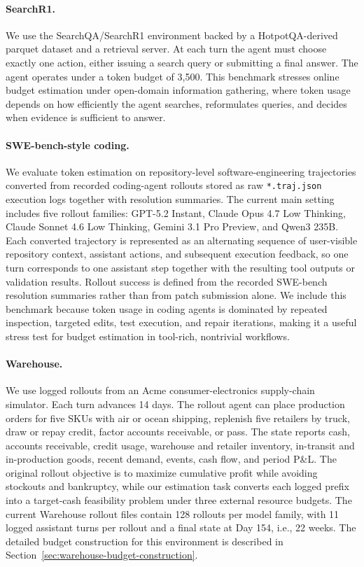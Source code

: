 \paragraph{SearchR1.}
We use the SearchQA/SearchR1 environment backed by a HotpotQA-derived parquet dataset and a retrieval server. At each turn the agent must choose exactly one action, either issuing a search query or submitting a final answer. The agent operates under a token budget of 3{,}500. This benchmark stresses online budget estimation under open-domain information gathering, where token usage depends on how efficiently the agent searches, reformulates queries, and decides when evidence is sufficient to answer.

\paragraph{SWE-bench-style coding.}
We evaluate token estimation on repository-level software-engineering trajectories converted from recorded coding-agent rollouts stored as raw \texttt{*.traj.json} execution logs together with resolution summaries. The current main setting includes five rollout families: GPT-5.2 Instant, Claude Opus 4.7 Low Thinking, Claude Sonnet 4.6 Low Thinking, Gemini 3.1 Pro Preview, and Qwen3 235B. Each converted trajectory is represented as an alternating sequence of user-visible repository context, assistant actions, and subsequent execution feedback, so one turn corresponds to one assistant step together with the resulting tool outputs or validation results. Rollout success is defined from the recorded SWE-bench resolution summaries rather than from patch submission alone. We include this benchmark because token usage in coding agents is dominated by repeated inspection, targeted edits, test execution, and repair iterations, making it a useful stress test for budget estimation in tool-rich, nontrivial workflows.

\paragraph{Warehouse.}
We use logged rollouts from an Acme consumer-electronics supply-chain simulator. Each turn advances 14 days. The rollout agent can place production orders for five SKUs with air or ocean shipping, replenish five retailers by truck, draw or repay credit, factor accounts receivable, or pass. The state reports cash, accounts receivable, credit usage, warehouse and retailer inventory, in-transit and in-production goods, recent demand, events, cash flow, and period P\&L. The original rollout objective is to maximize cumulative profit while avoiding stockouts and bankruptcy, while our estimation task converts each logged prefix into a target-cash feasibility problem under three external resource budgets. The current Warehouse rollout files contain 128 rollouts per model family, with 11 logged assistant turns per rollout and a final state at Day 154, i.e., 22 weeks. The detailed budget construction for this environment is described in Section~\ref{sec:warehouse-budget-construction}.

